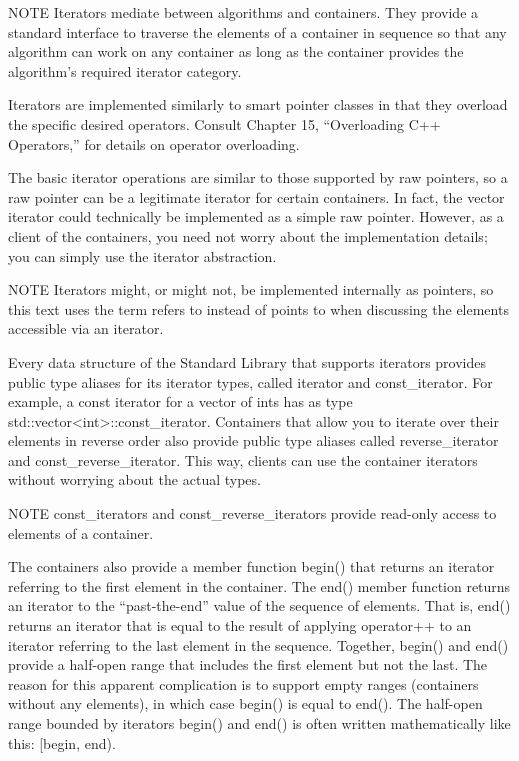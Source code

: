 \begin{myNotic}{NOTE}
Iterators mediate between algorithms and containers. They provide a standard interface to traverse the elements of a container in sequence so that any algorithm can work on any container as long as the container provides the algorithm’s required iterator category.
\end{myNotic}

Iterators are implemented similarly to smart pointer classes in that they overload the specific desired operators. Consult Chapter 15, “Overloading C++ Operators,” for details on operator overloading.

The basic iterator operations are similar to those supported by raw pointers, so a raw pointer can be a legitimate iterator for certain containers. In fact, the vector iterator could technically be implemented as a simple raw pointer. However, as a client of the containers, you need not worry about the implementation details; you can simply use the iterator abstraction.

\begin{myNotic}{NOTE}
 Iterators might, or might not, be implemented internally as pointers, so this text uses the term refers to instead of points to when discussing the elements accessible via an iterator.
\end{myNotic}


Every data structure of the Standard Library that supports iterators provides public type aliases for its iterator types, called iterator and const\_iterator. For example, a const iterator for a vector of ints has as type std::vector<int>::const\_iterator. Containers that allow you to iterate over their elements in reverse order also provide public type aliases called reverse\_iterator and const\_reverse\_iterator. This way, clients can use the container iterators without worrying about the actual types.

\begin{myNotic}{NOTE}
const\_iterators and const\_reverse\_iterators provide read-only access to elements of a container.
\end{myNotic}

The containers also provide a member function begin() that returns an iterator referring to the first element in the container. The end() member function returns an iterator to the “past-the-end” value of the sequence of elements. That is, end() returns an iterator that is equal to the result of applying operator++ to an iterator referring to the last element in the sequence. Together, begin() and end() provide a half-open range that includes the first element but not the last. The reason for this apparent complication is to support empty ranges (containers without any elements), in which case begin() is equal to end(). The half-open range bounded by iterators begin() and end() is often written mathematically like this: [begin, end).

